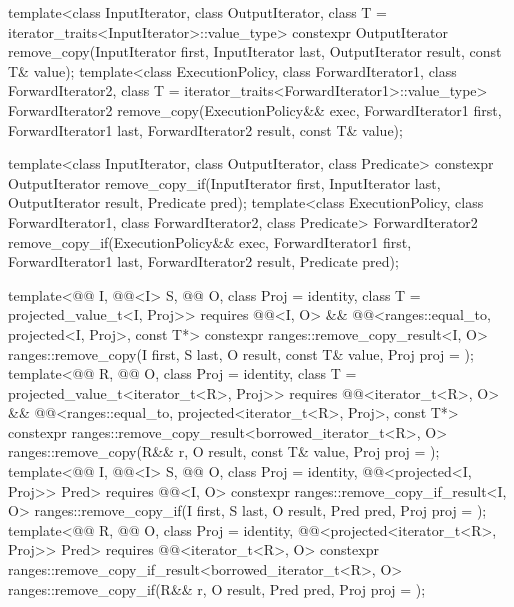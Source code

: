 %
%
\begin{itemdecl}
template<class InputIterator, class OutputIterator,
         class T = iterator_traits<InputIterator>::value_type>
  constexpr OutputIterator
    remove_copy(InputIterator first, InputIterator last,
                OutputIterator result, const T& value);
template<class ExecutionPolicy, class ForwardIterator1, class ForwardIterator2,
         class T = iterator_traits<ForwardIterator1>::value_type>
  ForwardIterator2
    remove_copy(ExecutionPolicy&& exec,
                ForwardIterator1 first, ForwardIterator1 last,
                ForwardIterator2 result, const T& value);

template<class InputIterator, class OutputIterator, class Predicate>
  constexpr OutputIterator
    remove_copy_if(InputIterator first, InputIterator last,
                   OutputIterator result, Predicate pred);
template<class ExecutionPolicy, class ForwardIterator1, class ForwardIterator2,
         class Predicate>
  ForwardIterator2
    remove_copy_if(ExecutionPolicy&& exec,
                   ForwardIterator1 first, ForwardIterator1 last,
                   ForwardIterator2 result, Predicate pred);

template<@@ I, @@<I> S, @@ O,
         class Proj = identity, class T = projected_value_t<I, Proj>>
  requires @@<I, O> &&
           @@<ranges::equal_to, projected<I, Proj>, const T*>
  constexpr ranges::remove_copy_result<I, O>
    ranges::remove_copy(I first, S last, O result, const T& value, Proj proj = {});
template<@@ R, @@ O, class Proj = identity,
         class T = projected_value_t<iterator_t<R>, Proj>>
  requires @@<iterator_t<R>, O> &&
           @@<ranges::equal_to, projected<iterator_t<R>, Proj>, const T*>
  constexpr ranges::remove_copy_result<borrowed_iterator_t<R>, O>
    ranges::remove_copy(R&& r, O result, const T& value, Proj proj = {});
template<@@ I, @@<I> S, @@ O,
         class Proj = identity, @@<projected<I, Proj>> Pred>
  requires @@<I, O>
  constexpr ranges::remove_copy_if_result<I, O>
    ranges::remove_copy_if(I first, S last, O result, Pred pred, Proj proj = {});
template<@@ R, @@ O, class Proj = identity,
         @@<projected<iterator_t<R>, Proj>> Pred>
  requires @@<iterator_t<R>, O>
  constexpr ranges::remove_copy_if_result<borrowed_iterator_t<R>, O>
    ranges::remove_copy_if(R&& r, O result, Pred pred, Proj proj = {});
\end{itemdecl}

